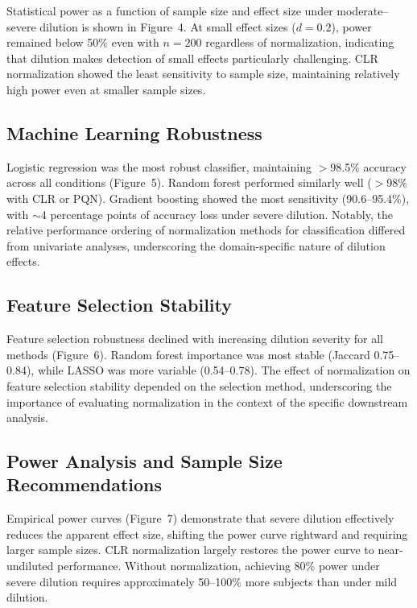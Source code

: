 \documentclass[12pt]{article}
\begin{document}
Statistical power as a function of sample size and effect size under moderate--severe dilution is shown in Figure~4. At small effect sizes ($d = 0.2$), power remained below 50\% even with $n = 200$ regardless of normalization, indicating that dilution makes detection of small effects particularly challenging. CLR normalization showed the least sensitivity to sample size, maintaining relatively high power even at smaller sample sizes.

\subsection{Machine Learning Robustness}

Logistic regression was the most robust classifier, maintaining $>$98.5\% accuracy across all conditions (Figure~5). Random forest performed similarly well ($>$98\% with CLR or PQN). Gradient boosting showed the most sensitivity (90.6--95.4\%), with $\sim$4 percentage points of accuracy loss under severe dilution. Notably, the relative performance ordering of normalization methods for classification differed from univariate analyses, underscoring the domain-specific nature of dilution effects.

\subsection{Feature Selection Stability}

Feature selection robustness declined with increasing dilution severity for all methods (Figure~6). Random forest importance was most stable (Jaccard 0.75--0.84), while LASSO was more variable (0.54--0.78). The effect of normalization on feature selection stability depended on the selection method, underscoring the importance of evaluating normalization in the context of the specific downstream analysis.

\subsection{Power Analysis and Sample Size Recommendations}

Empirical power curves (Figure~7) demonstrate that severe dilution effectively reduces the apparent effect size, shifting the power curve rightward and requiring larger sample sizes. CLR normalization largely restores the power curve to near-undiluted performance. Without normalization, achieving 80\% power under severe dilution requires approximately 50--100\% more subjects than under mild dilution.
\end{document}

